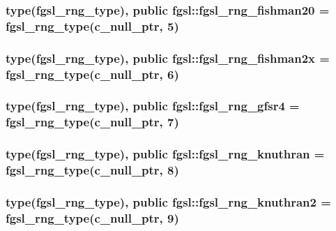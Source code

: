 \hypertarget{classfgsl_aaa1400ecb0b7757a72553cd766ac5880}{
\subsubsection[{fgsl\-\_\-rng\-\_\-fishman20}]{\setlength{\rightskip}{0pt plus 5cm}type({\bf fgsl\-\_\-rng\-\_\-type}), public fgsl\-::fgsl\-\_\-rng\-\_\-fishman20 = {\bf fgsl\-\_\-rng\-\_\-type}(c\-\_\-null\-\_\-ptr, 5)}}\label{classfgsl_aaa1400ecb0b7757a72553cd766ac5880}
\hypertarget{classfgsl_a6564b2d833a35c41a82dc834f2cc3263}{
\subsubsection[{fgsl\-\_\-rng\-\_\-fishman2x}]{\setlength{\rightskip}{0pt plus 5cm}type({\bf fgsl\-\_\-rng\-\_\-type}), public fgsl\-::fgsl\-\_\-rng\-\_\-fishman2x = {\bf fgsl\-\_\-rng\-\_\-type}(c\-\_\-null\-\_\-ptr, 6)}}\label{classfgsl_a6564b2d833a35c41a82dc834f2cc3263}
\hypertarget{classfgsl_a12158a5916e899c6bf9c9ceee7352105}{
\subsubsection[{fgsl\-\_\-rng\-\_\-gfsr4}]{\setlength{\rightskip}{0pt plus 5cm}type({\bf fgsl\-\_\-rng\-\_\-type}), public fgsl\-::fgsl\-\_\-rng\-\_\-gfsr4 = {\bf fgsl\-\_\-rng\-\_\-type}(c\-\_\-null\-\_\-ptr, 7)}}\label{classfgsl_a12158a5916e899c6bf9c9ceee7352105}
\hypertarget{classfgsl_af73840b5889e5a54be83e7596d5973c0}{
\subsubsection[{fgsl\-\_\-rng\-\_\-knuthran}]{\setlength{\rightskip}{0pt plus 5cm}type({\bf fgsl\-\_\-rng\-\_\-type}), public fgsl\-::fgsl\-\_\-rng\-\_\-knuthran = {\bf fgsl\-\_\-rng\-\_\-type}(c\-\_\-null\-\_\-ptr, 8)}}\label{classfgsl_af73840b5889e5a54be83e7596d5973c0}
\hypertarget{classfgsl_a528795b3607aafcfc90f8615237804fa}{
\subsubsection[{fgsl\-\_\-rng\-\_\-knuthran2}]{\setlength{\rightskip}{0pt plus 5cm}type({\bf fgsl\-\_\-rng\-\_\-type}), public fgsl\-::fgsl\-\_\-rng\-\_\-knuthran2 = {\bf fgsl\-\_\-rng\-\_\-type}(c\-\_\-null\-\_\-ptr, 9)}}\label{classfgsl_a528795b3607aafcfc90f8615237804fa}
